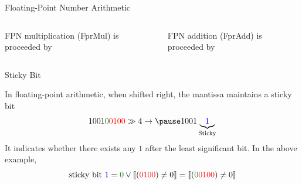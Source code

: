 \begin{frame}{Floating-Point Number Arithmetic}

\begin{columns}[T]
FPN multiplication (FprMul) is proceeded by

FPN addition (FprAdd) is proceeded by


\end{columns}
\medskip

\pause

\end{frame}


\begin{frame}{Sticky Bit}

In floating-point arithmetic, when shifted right, the mantissa maintains a sticky bit
\[
	1001\textcolor{black!50!green}{0}\textcolor{red}{0100} \gg 4 \to
	\pause
	1001\underbrace{\textcolor{blue}{1}}_{\text{Sticky}}
\]
\pause
It indicates whether there exists any $1$ after the least significant bit. \pause In the above example,
\[
	\text{sticky bit } \textcolor{blue}{1} = \textcolor{black!50!green}{0} \vee \llbracket (\textcolor{red}{0100}) \neq 0 \rrbracket = \llbracket (\textcolor{black!50!green}{0}\textcolor{red}{0100}) \neq 0 \rrbracket
\]

\end{frame}


